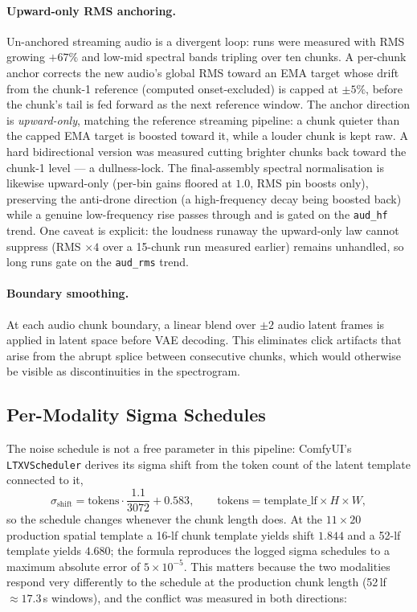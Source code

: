 \documentclass[12pt]{article}
\begin{document}
\paragraph{Upward-only RMS anchoring.}
Un-anchored streaming audio is a divergent loop: runs were measured with RMS
growing $+67\%$ and low-mid spectral bands tripling over ten chunks.  A
per-chunk anchor corrects the new audio's global RMS toward an EMA target
whose drift from the chunk-1 reference (computed onset-excluded) is capped at
$\pm5\%$, before the chunk's tail is fed forward as the next reference
window.  The anchor direction is \emph{upward-only}, matching the reference
streaming pipeline: a chunk quieter than the capped EMA target is boosted
toward it, while a louder chunk is kept raw.  A hard bidirectional version
was measured cutting brighter chunks back toward the chunk-1 level --- a
dullness-lock.  The final-assembly spectral normalisation is likewise
upward-only (per-bin gains floored at $1.0$, RMS pin boosts only), preserving
the anti-drone direction (a high-frequency decay being boosted back) while a
genuine low-frequency rise passes through and is gated on the
\texttt{aud\_hf} trend.  One caveat is explicit: the loudness runaway the
upward-only law cannot suppress (RMS $\times4$ over a 15-chunk run measured
earlier) remains unhandled, so long runs gate on the \texttt{aud\_rms} trend.

\paragraph{Boundary smoothing.}
At each audio chunk boundary, a linear blend over $\pm2$ audio latent frames
is applied in latent space before VAE decoding.  This eliminates click
artifacts that arise from the abrupt splice between consecutive chunks,
which would otherwise be visible as discontinuities in the spectrogram.

\subsection{Per-Modality Sigma Schedules}
\label{sec:sigmasplit}

The noise schedule is not a free parameter in this pipeline: ComfyUI's
\texttt{LTXVScheduler} derives its sigma shift from the token count of the
latent template connected to it,
\begin{equation}
\sigma_{\text{shift}} = \text{tokens}\cdot\frac{1.1}{3072} + 0.583,
\qquad \text{tokens} = \text{template\_lf}\times H\times W ,
\label{eq:sigmashift}
\end{equation}
so the schedule changes whenever the chunk length does.  At the
$11\times20$ production spatial template a 16-lf chunk template yields
shift $1.844$ and a 52-lf template yields $4.680$; the formula reproduces
the logged sigma schedules to a maximum absolute error of $5\times10^{-5}$.
This matters because the two modalities respond very differently to the
schedule at the production chunk length (52\,lf $\approx17.3$\,s windows),
and the conflict was measured in both directions:
\end{document}
